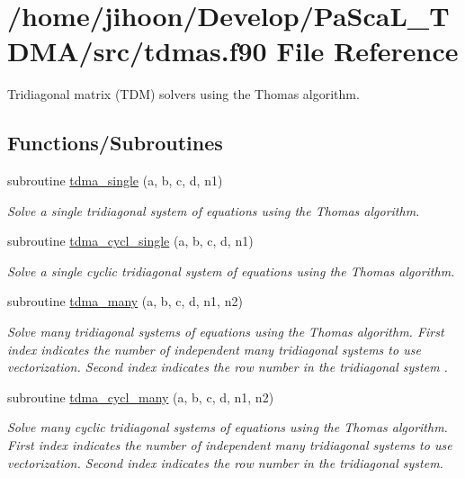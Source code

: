 \hypertarget{tdmas_8f90}{}\section{/home/jihoon/\+Develop/\+Pa\+Sca\+L\+\_\+\+T\+D\+M\+A/src/tdmas.f90 File Reference}
\label{tdmas_8f90}


Tridiagonal matrix (T\+DM) solvers using the Thomas algorithm.  


\subsection*{Functions/\+Subroutines}
\begin{DoxyCompactItemize}
\item 
subroutine \hyperlink{tdmas_8f90_a4a6130fff49607012fefacc8640424a7}{tdma\+\_\+single} (a, b, c, d, n1)
\begin{DoxyCompactList}\small\item\em Solve a single tridiagonal system of equations using the Thomas algorithm. \end{DoxyCompactList}\item 
subroutine \hyperlink{tdmas_8f90_a4cb1f95e9c608085c5bb19baff639d9e}{tdma\+\_\+cycl\+\_\+single} (a, b, c, d, n1)
\begin{DoxyCompactList}\small\item\em Solve a single cyclic tridiagonal system of equations using the Thomas algorithm. \end{DoxyCompactList}\item 
subroutine \hyperlink{tdmas_8f90_ab8cc761496e63e21ee8379d4fc077f05}{tdma\+\_\+many} (a, b, c, d, n1, n2)
\begin{DoxyCompactList}\small\item\em Solve many tridiagonal systems of equations using the Thomas algorithm. First index indicates the number of independent many tridiagonal systems to use vectorization. Second index indicates the row number in the tridiagonal system . \end{DoxyCompactList}\item 
subroutine \hyperlink{tdmas_8f90_a6c50d548eaa4b5e9b96ccbf8f65cb12a}{tdma\+\_\+cycl\+\_\+many} (a, b, c, d, n1, n2)
\begin{DoxyCompactList}\small\item\em Solve many cyclic tridiagonal systems of equations using the Thomas algorithm. First index indicates the number of independent many tridiagonal systems to use vectorization. Second index indicates the row number in the tridiagonal system. \end{DoxyCompactList}\end{DoxyCompactItemize}


